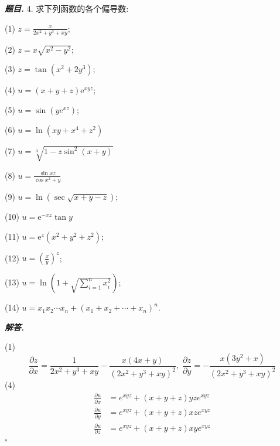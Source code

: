 \documentclass[10pt, a4paper, oneside]{ctexart}
\newenvironment{problem}{\begin{framed}\par\noindent\textbf{\textit{题目. }}}{\end{framed}\par}
\newenvironment{solution}{%
  \par\noindent\textbf{\textit{解答. }}\ignorespaces
}{%
  \hfill\ensuremath{\square}\par %
}
\begin{document}
\begin{problem}
4. 求下列函数的各个偏导数:

(1) $z=\frac{x}{2 x^2+y^3+x y}$;

(2) $z=x \sqrt{x^2-y^2}$;

(3) $z=\tan \left(x^2+2 y^3\right)$;

(4) $u=(x+y+z) \mathrm{e}^{x y z}$;

(5) $u=\sin \left(y e^{x z}\right)$;

(6) $u=\ln \left(x y+x^4+z^2\right)$

(7) $u=\sqrt[3]{1-z \sin ^2(x+y)}$

(8) $u=\frac{\sin x z}{\cos x^2+y}$

(9) $u=\ln (\sec \sqrt{x+y-z})$;

(10) $u=\mathrm{e}^{-x z} \tan y$

(11) $u=\mathrm{e}^z\left(x^2+y^2+z^2\right)$;

(12) $u=\left(\frac{x}{y}\right)^z$;

(13) $u=\ln \left(1+\sqrt{\sum_{i=1}^n x_i^2}\right)$;

(14) $u=x_1 x_2 \cdots x_n+\left(x_1+x_2+\cdots+x_n\right)^n$.
\end{problem}
\begin{solution}
(1)
$$\frac{\partial z}{\partial x}=\frac{1}{2x^2+y^3+xy}-\frac{x(4x+y)}{(2x^2+y^3+xy)^2}, \;\frac{\partial z}{\partial y}=-\frac{x(3y^2+x)}{(2x^2+y^3+xy)^2}$$
(4)
\begin{align*}
\frac{\partial u}{\partial x}&=e^{xyz}+(x+y+z)yze^{xyz}\\
\frac{\partial u}{\partial y}&=e^{xyz}+(x+y+z)xze^{xyz}\\
\frac{\partial u}{\partial z}&=e^{xyz}+(x+y+z)xye^{xyz}\\
\end{align*}
\end{solution}
\end{document}
